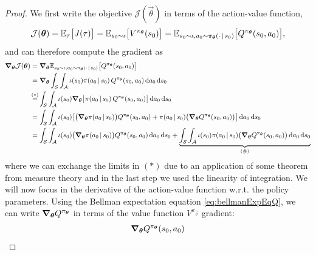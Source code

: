 		\begin{proof}
			We first write the objective \(\mathcal{J}(\vec{\theta})\) in terms of the action-value function,
			\begin{equation}
				\mathcal{J}(\bm{\theta})
					= \mathbb{E}_{\tau}\bigl[ J(\tau) \bigr]
					= \mathbb{E}_{s_0 \sim \iota}\bigl[ V^{\pi_{\bm{\theta}}}(s_0) \bigr]
					= \mathbb{E}_{s_0 \sim \iota, a_0 \sim \pi_{\bm{\theta}}(\cdot \,\vert\, s_0)}\bigl[ Q^{\pi_{\bm{\theta}}}(s_0, a_0) \bigr],
				\label{eq:pgtDecomp}
			\end{equation}
			and can therefore compute the gradient as
			\begin{align}
				\grad_{\vec{\theta}} \mathcal{J}(\vec{\theta})
					&= \grad_{\vec{\theta}} \E_{s_0 \sim \iota, a_0 \sim \pi_{\vec{\theta}}(\cdot \given s_0)}\bigl[ Q^{\pi_{\vec{\theta}}}(s_0, a_0) \bigr]  \label{eq:pgtDecomp2} \\
					&= \grad_{\vec{\theta}} \int_\mathcal{S} \int_\mathcal{A} \iota(s_0) \pi(a_0 \given s_0) \, Q^{\pi_{\vec{\theta}}}(s_0, a_0) \dd{a_0} \dd{s_0} \\
					&\overset{\mathclap{(\ast)}}{=} \int_\mathcal{S} \int_\mathcal{A} \iota(s_0) \grad_{\vec{\theta}} \bigl[ \pi(a_0 \given s_0) \, Q^{\pi_{\vec{\theta}}}(s_0, a_0) \bigr] \dd{a_0} \dd{s_0} \\
					&= \int_\mathcal{S} \int_\mathcal{A} \iota(s_0) \bigl[ \bigl( \grad_{\vec{\theta}} \pi(a_0 \given s_0) \bigr) Q^{\pi_{\vec{\theta}}}(s_0, a_0) + \pi(a_0 \given s_0) \bigl( \grad_{\vec{\theta}} Q^{\pi_{\vec{\theta}}}(s_0, a_0) \bigr) \bigr] \dd{a_0} \dd{s_0} \\
					&= \int_\mathcal{S} \int_\mathcal{A} \iota(s_0) \bigl( \grad_{\vec{\theta}} \pi(a_0 \given s_0) \bigr) Q^{\pi_{\vec{\theta}}}(s_0, a_0) \dd{a_0} \dd{s_0} + \underbrace{\int_\mathcal{S} \int_\mathcal{A} \iota(s_0) \pi(a_0 \given s_0) \bigl( \grad_{\vec{\theta}} Q^{\pi_{\vec{\theta}}}(s_0, a_0) \bigr) \dd{a_0} \dd{s_0}}_{(\#)}
			\end{align}
			where we can exchange the limits in \((\ast)\) due to an application of some theorem from measure theory and in the last step we used the linearity of integration. We will now focus in the derivative of the action-value function w.r.t. the policy parameters. Using the Bellman expectation equation \eqref{eq:bellmanExpEqQ}, we can write \(\grad_{\bm{\theta}} Q^{\pi_{\bm{\theta}}}\) in terms of the value function \(V^{\pi_{\vec{\theta}}}\) gradient:
			\begin{align}
				\grad_{\vec{\theta}} Q^{\pi_{\vec{\theta}}}(s_0, a_0)

\end{align}
\end{proof}
